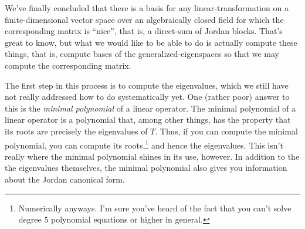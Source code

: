 We've finally concluded that there is a basis for any linear-transformation on a finite-dimensional vector space over an algebraically closed field for which the corresponding matrix is ``nice'', that is, a direct-sum of Jordan blocks.  That's great to know, but what we would like to be able to do is actually compute these things, that is, compute bases of the generalized-eigenspaces so that we may compute the corresponding matrix.

The first step in this process is to compute the eigenvalues, which we still have not really addressed how to do systematically yet.  One (rather poor) answer to this is the \emph{minimal polynomial} of a linear operator.  The minimal polynomial of a linear operator is a polynomial that, among other things, has the property that its roots are precisely the eigenvalues of $T$.  Thus, if you can compute the minimal polynomial, you can compute its roots,\footnote{Numerically anyways.  I'm sure you've heard of the fact that you can't solve degree $5$ polynomial equations or higher in general.} and hence the eigenvalues.  This isn't really where the minimal polynomial shines in its use, however.  In addition to the the eigenvalues themselves, the minimal polynomial also gives you information about the Jordan canonical form.

